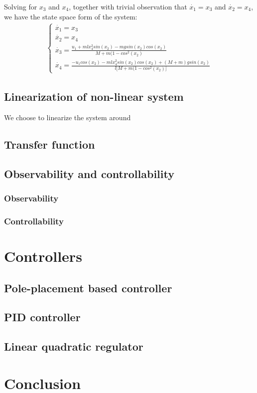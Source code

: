 \documentclass [12pt,letterpaper]{exam}
\begin{document}
Solving for $x_3$ and $x_4$, together with trivial observation that $\dot{x_1} = x_3$ and $\dot{x_2} = x_4$, we have the state space form of the system:
\begin{align}
\begin{cases}
\dot{x_1} = x_3 \\
\dot{x_2} = x_4 \\
\dot{x_3} = \frac{u_1 + mlx_4^2sin(x_2) - mgsin(x_2)cos(x_2)}{M + m(1 - cos^{2}(x_2)} \\
\dot{x_4} = \frac{-u_1cos(x_2) - mlx_4^2sin(x_2)cos(x_2) + (M + m)gsin(x_2)}{l\big[M + m(1 - cos^{2}(x_2)\big]}
\end{cases}
\end{align}

\subsection{Linearization of non-linear system}
We choose to linearize the system around 

\subsection{Transfer function}
\subsection{Observability and controllability}
\subsubsection{Observability}
\subsubsection{Controllability}
\newpage
\section{Controllers}
\subsection{Pole-placement based controller}
\subsection{PID controller}
\subsection{Linear quadratic regulator}
\newpage
\section{Conclusion}
\end{document}
